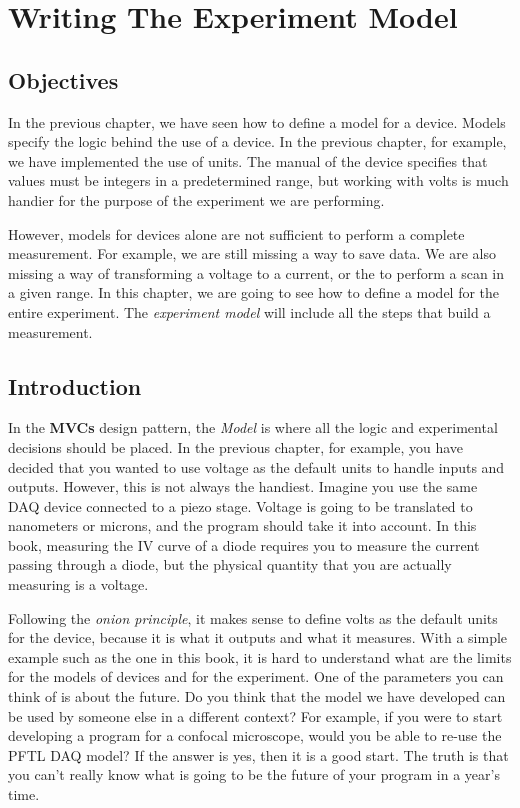 \chapter{Writing The Experiment Model}\label{chapter:experiment-model}

\section{Objectives}
In the previous chapter, we have seen how to define a model for a device. Models specify the logic behind the use of a device. In the previous chapter, for example, we have implemented the use of units. The manual of the device specifies that values must be integers in a predetermined range, but working with volts is much handier for the purpose of the experiment we are performing. 

However, models for devices alone are not sufficient to perform a complete measurement. For example, we are still missing a way to save data. We are also missing a way of transforming a voltage to a current, or the to perform a scan in a given range. In this chapter, we are going to see how to define a model for the entire experiment. The \emph{experiment model} will include all the steps that build a measurement.

\section{Introduction}
In the \textbf{MVCs} design pattern, the \emph{Model} is where all the logic and experimental decisions should be placed. In the previous chapter, for example, you have decided that you wanted to use voltage as the default units to handle inputs and outputs. However, this is not always the handiest. Imagine you use the same {DAQ} device connected to a piezo stage. Voltage is going to be translated to nanometers or microns, and the program should take it into account. In this book, measuring the IV curve of a diode requires you to measure the current passing through a diode, but the physical quantity that you are actually measuring is a voltage.

Following the \emph{onion principle}, it makes sense to define volts as the default units for the device, because it is what it outputs and what it measures. With a simple example such as the one in this book, it is hard to understand what are the limits for the models of devices and for the experiment. One of the parameters you can think of is about the future. Do you think that the model we have developed can be used by someone else in a different context? For example, if you were to start developing a program for a confocal microscope, would you be able to re-use the {PFTL DAQ} model? If the answer is yes, then it is a good start. The truth is that you can't really know what is going to be the future of your program in a year's time.

